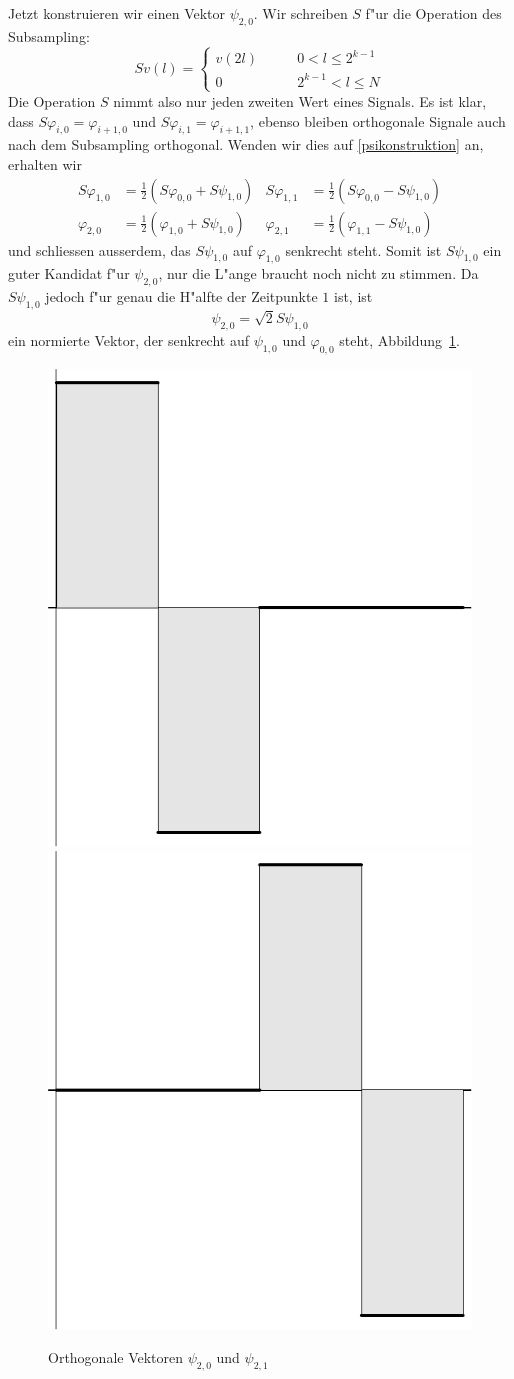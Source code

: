 Jetzt konstruieren wir einen Vektor $\psi_{2,0}$. Wir schreiben $S$
f"ur die Operation des Subsampling:
\[
Sv(l)=\begin{cases}
v(2l)&\qquad 0 <l \le 2^{k-1}\\
0&\qquad 2^{k-1}<l\le N
\end{cases}
\]
Die Operation $S$ nimmt also nur jeden zweiten Wert eines Signals.
Es ist klar, dass $S\varphi_{i,0}=\varphi_{i+1,0}$ und
$S\varphi_{i,1}=\varphi_{i+1,1}$, ebenso bleiben orthogonale
Signale auch nach dem Subsampling orthogonal. Wenden wir dies
auf \ref{psikonstruktion} an, erhalten wir
\begin{align*}
S\varphi_{1,0}&=\frac12(S\varphi_{0,0}+S\psi_{1,0})
&
S\varphi_{1,1}&=\frac12(S\varphi_{0,0}-S\psi_{1,0})
\\
\varphi_{2,0}&=\frac12(\varphi_{1,0}+S\psi_{1,0})
&
\varphi_{2,1}&=\frac12(\varphi_{1,1}-S\psi_{1,0})
\end{align*}
und schliessen ausserdem, das $S\psi_{1,0}$ auf $\varphi_{1,0}$
senkrecht steht. Somit ist $S\psi_{1,0}$ ein guter Kandidat
f"ur $\psi_{2,0}$, nur die L"ange braucht noch nicht zu
stimmen. Da $S\psi_{1,0}$ jedoch f"ur genau die H"alfte der Zeitpunkte
$1$ ist, ist
$$\psi_{2,0}=\sqrt{2}S\psi_{1,0}$$
ein normierte Vektor, der senkrecht auf $\psi_{1,0}$ und $\varphi_{0,0}$
steht, Abbildung~\ref{psi2}.
\begin{figure}
\begin{center}
\includegraphics[width=0.45\hsize]{images/w-9}
\includegraphics[width=0.45\hsize]{images/w-10}
\end{center}
\caption{Orthogonale Vektoren $\psi_{2,0}$ und $\psi_{2,1}$\label{psi2}}
\end{figure}

